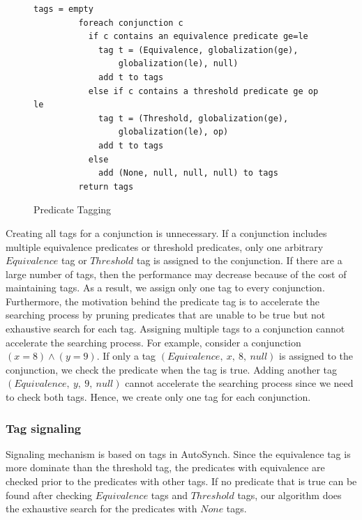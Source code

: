 \documentclass[preprint]{sigplanconf}
\begin{document}
\begin{figure}[ht!]
    \begin{Verbatim}[fontsize=\footnotesize,gobble=8,frame=lines,
            framesep=3mm]
         tags = empty
         foreach conjunction c 
           if c contains an equivalence predicate ge=le
             tag t = (Equivalence, globalization(ge), 
                 globalization(le), null)
             add t to tags
           else if c contains a threshold predicate ge op le
             tag t = (Threshold, globalization(ge), 
                 globalization(le), op)
             add t to tags
           else 
             add (None, null, null, null) to tags
         return tags
    \end{Verbatim}
  \caption{Predicate Tagging}
  \label{fig:tagging}
\end{figure}
Creating all tags for a conjunction is unnecessary. If a conjunction includes 
multiple equivalence predicates or threshold predicates, only one arbitrary 
$Equivalence$ tag or $Threshold$ tag is assigned to the conjunction. 
If there are a large number of tags, then the performance may decrease
because of the cost of maintaining tags. As a result, we assign only one tag to
every conjunction. Furthermore, the motivation behind the predicate tag is to 
accelerate the searching process by pruning predicates that are unable to be
true but not exhaustive search for each tag.  Assigning multiple tags to a 
conjunction cannot accelerate the searching process. For example, consider a 
conjunction $(x = 8) \wedge (y = 9)$. If only a tag 
$(Equivalence,\ x,\ 8,\ null)$
is assigned to the conjunction, we check the predicate when the tag is
true. Adding another tag $(Equivalence,\ y,\ 9,\ null)$ cannot accelerate the
searching process since we need to check both tags. Hence, we create only one 
tag for each conjunction.
 


\subsubsection{Tag signaling}
Signaling mechanism is based on tags in AutoSynch. 
Since the equivalence tag is more dominate than the threshold tag, the
predicates with equivalence are checked prior to the predicates with other 
tags. If no predicate that is true can be found after checking $Equivalence$ 
tags and $Threshold$ tags, our algorithm does the exhaustive search for the 
predicates with $None$ tags. 
\end{document}
